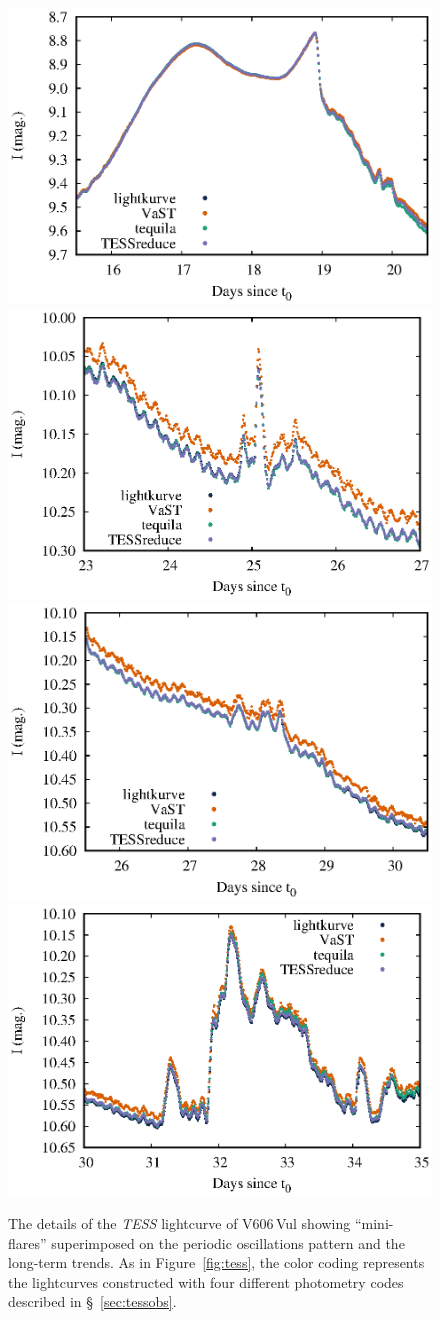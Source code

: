 \documentclass[twocolumn]{aastex631}
\newcommand{\nova}{V606\,Vul}
\begin{document}
\begin{figure}
\centering
        \includegraphics[width=0.48\linewidth,clip=true,trim=0.0cm 0cm 0cm 0cm,angle=0]{TESS_peak.eps}
        \includegraphics[width=0.48\linewidth,clip=true,trim=0.0cm 0cm 0cm 0cm,angle=0]{TESS_oscillations2.eps}\\
        \includegraphics[width=0.48\linewidth,clip=true,trim=0.0cm 0cm 0cm 0cm,angle=0]{TESS_oscillations.eps}
        \includegraphics[width=0.48\linewidth,clip=true,trim=0.0cm 0cm 0cm 0cm,angle=0]{TESS_miniflare.eps}
\caption{The details of the {\em TESS} lightcurve of \nova{} showing  
``mini-flares'' superimposed on the periodic oscillations pattern and the
long-term trends. As in Figure~\ref{fig:tess}, the color coding represents the lightcurves constructed
with four different photometry codes described in \S~\ref{sec:tessobs}.}
    \label{fig:tessdetails}
\end{figure}
\end{document}
